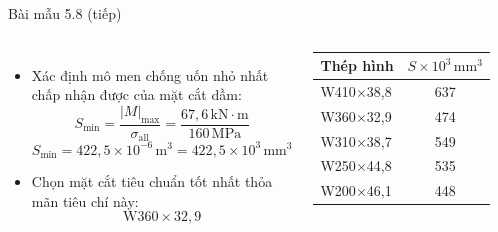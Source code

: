 \documentclass[aspectratio=169]{beamer}
\begin{document}
\begin{frame}[t]{Bài mẫu 5.8 (tiếp)}
  \begin{columns}[T]
      \small
      \begin{itemize}
        \setlength{\itemsep}{0.8em}
        \item Xác định mô men chống uốn nhỏ nhất chấp nhận được của mặt cắt
              dầm:
        \[
          S_{\min} = \frac{|M|_{\max}}{\sigma_{\mathrm{all}}}
            = \frac{67{,}6\,\mathrm{kN\cdot m}}{160\,\mathrm{MPa}}
        \]
        \[
          S_{\min} = 422{,}5\times10^{-6}\,\mathrm{m}^3
            = 422{,}5\times10^{3}\,\mathrm{mm}^3
        \]
        \item Chọn mặt cắt tiêu chuẩn tốt nhất thỏa mãn tiêu chí này:
        \[
          \boxed{\text{W}360\times32{,}9}
        \]
      \end{itemize}
      \centering
      \small
      \begin{tabular}{lc}
        \hline
        Thép hình & $S\times10^{3}\,\mathrm{mm}^3$\\
        \hline
        W410$\times$38,8 & 637\\
        W360$\times$32,9 & 474\\
        W310$\times$38,7 & 549\\
        W250$\times$44,8 & 535\\
        W200$\times$46,1 & 448\\
        \hline
      \end{tabular}
  \end{columns}
\end{frame}
\end{document}
